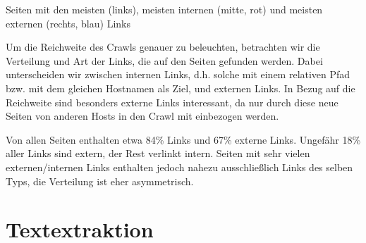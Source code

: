 \documentclass[a4paper,12pt,titlepage=false]{scrreprt}
\begin{document}
\centerline{Seiten mit den meisten (links), meisten internen (mitte, rot) und meisten externen (rechts, blau) Links}
\vspace{-.2cm}

Um die Reichweite des Crawls genauer zu beleuchten, betrachten wir die Verteilung und Art der Links, die auf den Seiten gefunden werden. Dabei unterscheiden wir zwischen internen Links, d.h. solche mit einem relativen Pfad bzw. mit dem gleichen Hostnamen als Ziel, und externen Links. In Bezug auf die Reichweite sind besonders externe Links interessant, da nur durch diese neue Seiten von anderen Hosts in den Crawl mit einbezogen werden.

Von allen Seiten enthalten etwa 84\% Links und 67\% externe Links. Ungefähr 18\% aller Links sind extern, der Rest verlinkt intern. Seiten mit sehr vielen externen/internen Links enthalten jedoch nahezu ausschließlich Links des selben Typs, die Verteilung ist eher asymmetrisch.

\chapter{Textextraktion}
\end{document}
